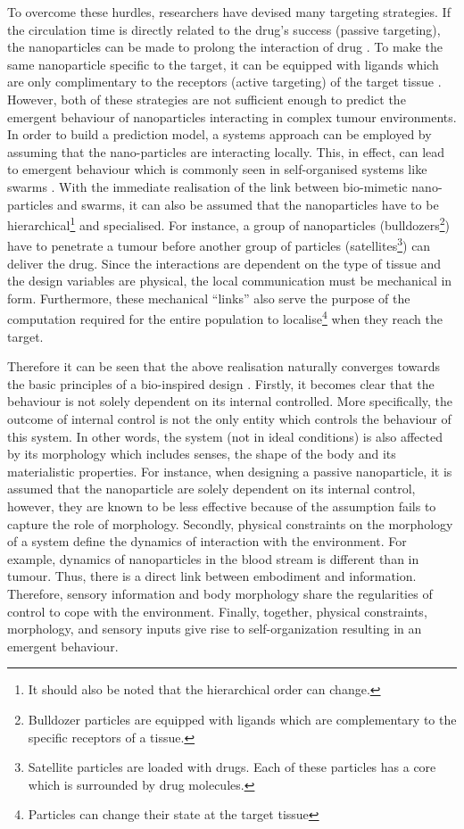 \documentclass[11pt,a4paper]{article}
\begin{document}
\begin{multicols}{2}
To overcome these hurdles, researchers have devised many
targeting strategies. If the circulation time is directly related to the drug's success (passive targeting), the nanoparticles can be made to prolong the interaction of drug \cite{van2007poly}. To make the same nanoparticle specific to the target, it can be equipped with ligands which are only complimentary to the receptors (active targeting) of the
target tissue \cite{galvin2012nanoparticle}. However, both of these strategies are not sufficient enough to predict the emergent behaviour of nanoparticles interacting in complex tumour environments. In order to build a prediction model, a systems approach can be employed by assuming that the nano-particles are interacting locally. This, in effect, can lead to emergent behaviour which is commonly seen in self-organised systems like swarms \cite{hauertnisms}. With the immediate realisation of the link between bio-mimetic nano-particles and swarms, it can also be assumed that the nanoparticles have to be hierarchical\footnote{It should also be noted that the hierarchical order can change.} and specialised. For instance, a group of nanoparticles (bulldozers\footnote{Bulldozer particles are equipped with ligands which are complementary to the specific receptors of a tissue.}) have to penetrate a tumour before another group of particles (satellites\footnote{Satellite particles are loaded with drugs. Each of these particles has a core which is surrounded by drug molecules.}) can deliver the drug. Since the interactions are dependent on the type of tissue and the design variables are physical, the local communication must be mechanical in form. Furthermore, these mechanical ``links'' also serve the purpose of the computation required for the entire population to localise\footnote{Particles can change their state at the target tissue} when they reach the target.

Therefore it can be seen that the above realisation naturally converges towards the basic principles of a bio-inspired design \cite{pfeifer2007self}. Firstly, it becomes clear that the behaviour is not solely dependent on its internal controlled. More specifically, the outcome of internal control is not the only entity which controls the behaviour of this system. In other words, the system (not in ideal conditions) is also affected by its morphology which includes senses, the shape of the body and its materialistic properties. For instance, when designing a passive nanoparticle, it is assumed that the nanoparticle are solely dependent on its internal control, however, they are known to be less effective because of the assumption fails to capture the role of morphology. Secondly, physical constraints on the morphology of a system define the dynamics of interaction with the environment. For example, dynamics of nanoparticles in the blood stream is different than in tumour. Thus, there is a direct link between embodiment and information. Therefore, sensory information and body morphology share the regularities of control to cope with the environment. Finally, together, physical constraints, morphology, and sensory inputs give rise to self-organization resulting in an emergent behaviour. 


\end{multicols}
\end{document}
